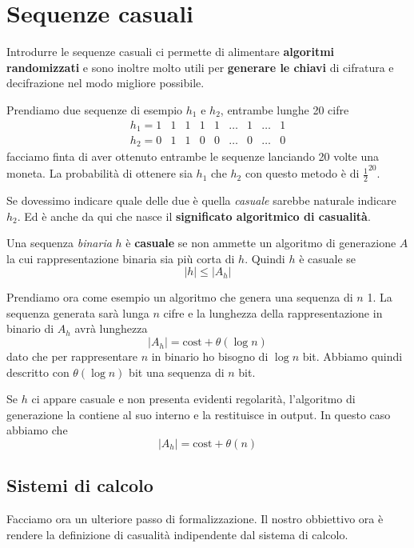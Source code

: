 \chapter{Sequenze casuali}
Introdurre le sequenze casuali ci permette di alimentare \textbf{algoritmi randomizzati} e sono inoltre molto utili
per \textbf{generare le chiavi} di cifratura e decifrazione nel modo migliore possibile.

Prendiamo due sequenze di esempio $h_1$ e $h_2$, entrambe lunghe 20 cifre
\[
	\begin{matrix}
		h_1 = 1 & 1 & 1 & 1 & 1 & \dots & 1 & \dots & 1 \\
		h_2 = 0 & 1 & 1 & 0 & 0 & \dots & 0 & \dots & 0
	\end{matrix}
\]
facciamo finta di aver ottenuto entrambe le sequenze lanciando 20 volte una moneta. La probabilit\`a di ottenere sia
$h_1$ che $h_2$ con questo metodo \`e di $\frac{1}{2}^{20}$.

Se dovessimo indicare quale delle due \`e quella \emph{casuale} sarebbe naturale indicare $h_2$. Ed \`e anche da qui che
nasce il \textbf{significato algoritmico di casualit\`a}.

\begin{definition}[Kolmogorov]
	Una sequenza \emph{binaria} $h$ \`e \textbf{casuale} se non ammette un algoritmo di generazione $A$ la cui
	rappresentazione binaria sia pi\`u corta di $h$. Quindi $h$ \`e casuale se
	\[ |h| \leq |A_h| \]
\end{definition}

Prendiamo ora come esempio un algoritmo che genera una sequenza di $n$ 1. La sequenza generata sar\`a lunga $n$ cifre
e la lunghezza della rappresentazione in binario di $A_h$ avr\`a lunghezza
\[ |A_h| = \text{cost} + \theta(\log n) \]
dato che per rappresentare $n$ in binario ho bisogno di $\log n$ bit. Abbiamo quindi descritto con $\theta(\log n)$ bit
una sequenza di $n$ bit.

Se $h$ ci appare casuale e non presenta evidenti regolarit\`a, l'algoritmo di generazione la contiene al suo interno e
la restituisce in output. In questo caso abbiamo che
\[ |A_h| = \text{cost} + \theta(n) \]

\section{Sistemi di calcolo}
Facciamo ora un ulteriore passo di formalizzazione. Il nostro obbiettivo ora \`e rendere la definizione di casualit\`a
indipendente dal sistema di calcolo.